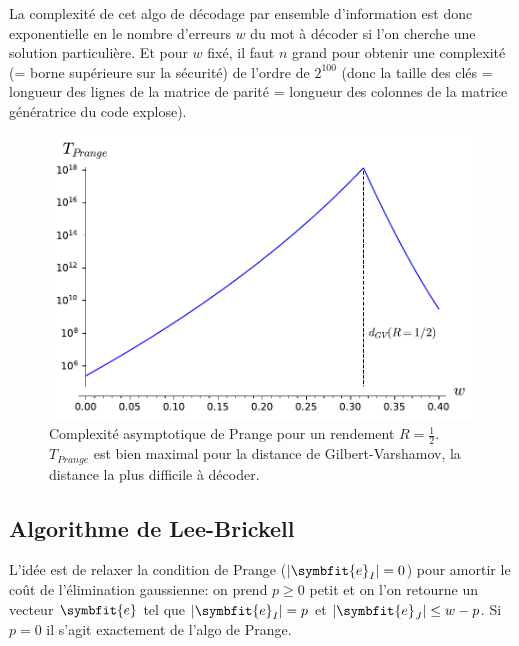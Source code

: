 \documentclass{scrartcl}[a4paper,9pt,headings=small,footinclude=false]
\theoremstyle{definition}
\theoremstyle{remark}
\begin{document}
La complexité de cet algo de décodage par ensemble d'information est donc exponentielle en le nombre d'erreurs $w$ du mot à décoder si l'on cherche une solution particulière. Et pour $w$ fixé, il faut $n$ grand pour obtenir une complexité (= borne supérieure sur la sécurité) de l'ordre de $2^{100}$ (donc la taille des clés = longueur des lignes de la matrice de parité = longueur des colonnes de la matrice génératrice du code explose).

\begin{figure}[h]
\centering
\includegraphics{decodage_syndrome/prange.pdf}
\caption{Complexité asymptotique de Prange pour un rendement $R=\frac{1}{2}$. $T_{Prange}$ est bien maximal pour la distance de Gilbert-Varshamov, la distance la plus difficile à décoder.}
\label{fig:prange}
\end{figure}


\subsection{Algorithme de Lee-Brickell}

L'idée est de relaxer la condition de Prange ($|\symbfit{e}_I|=0$) pour amortir le coût de l'élimination gaussienne: on prend $p\geq 0$ petit et on l'on retourne un vecteur $\symbfit{e}$ tel que $|\symbfit{e}_I|=p$ et $|\symbfit{e}_J|\leq w-p$. Si $p=0$ il s'agit exactement de l'algo de Prange.
\end{document}
